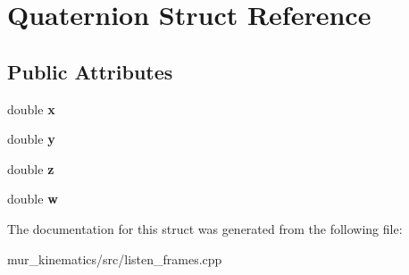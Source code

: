 \hypertarget{structQuaternion}{}\section{Quaternion Struct Reference}
\label{structQuaternion}
\subsection*{Public Attributes}
\begin{DoxyCompactItemize}
\item 
\mbox{\label{structQuaternion_a65c93d8db6c57203447bd0594b608512}} 
double {\bfseries x}
\item 
\mbox{\label{structQuaternion_acfea23e3ba2b57356fe36b4d8f4c52f3}} 
double {\bfseries y}
\item 
\mbox{\label{structQuaternion_a90bbdb05526bddfbc3247dcc9a5cace4}} 
double {\bfseries z}
\item 
\mbox{\label{structQuaternion_aeded08fcb4e8d0866e612ed81cb44aa7}} 
double {\bfseries w}
\end{DoxyCompactItemize}


The documentation for this struct was generated from the following file\+:\begin{DoxyCompactItemize}
\item 
mur\+\_\+kinematics/src/listen\+\_\+frames.\+cpp\end{DoxyCompactItemize}

